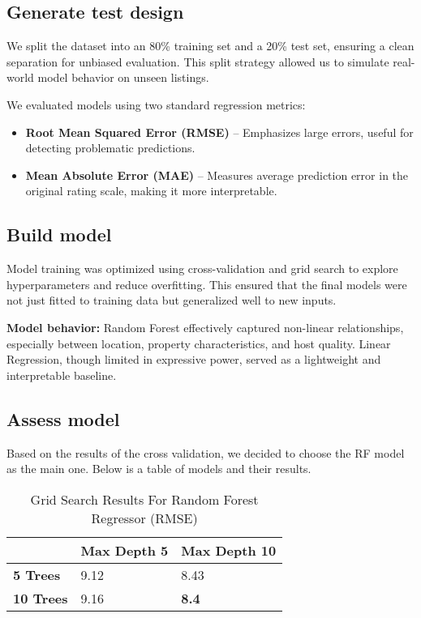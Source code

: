 \subsection{Generate test design}
We split the dataset into an 80\% training set and a 20\% test set, ensuring a clean separation for unbiased evaluation. This split strategy allowed us to simulate real-world model behavior on unseen listings.

We evaluated models using two standard regression metrics:
\begin{itemize}
    \item \textbf{Root Mean Squared Error (RMSE)} – Emphasizes large errors, useful for detecting problematic predictions.
    \item \textbf{Mean Absolute Error (MAE)} – Measures average prediction error in the original rating scale, making it more interpretable.
\end{itemize}

\subsection{Build model }
Model training was optimized using cross-validation and grid search to explore hyperparameters and reduce overfitting. This ensured that the final models were not just fitted to training data but generalized well to new inputs.

\textbf{Model behavior:}  
Random Forest effectively captured non-linear relationships, especially between location, property characteristics, and host quality. Linear Regression, though limited in expressive power, served as a lightweight and interpretable baseline.

\subsection{Assess model }

Based on the results of the cross validation, we decided to choose the RF model as the main one. Below is a table of models and their results.

\begin{table}[ht!]
\small
\centering
\caption{Grid Search Results For Random Forest Regressor (RMSE)}
\label{tab:grid_search_rf_rmse}
\begin{tabular}{lll} 
\toprule
  & \textbf{Max Depth 5} & \textbf{Max Depth 10} \\
\midrule
\textbf{5 Trees} & 9.12 & 8.43 \\
\textbf{10 Trees} &  9.16 & \textbf{8.4} \\
\bottomrule
\end{tabular}
\end{table}

